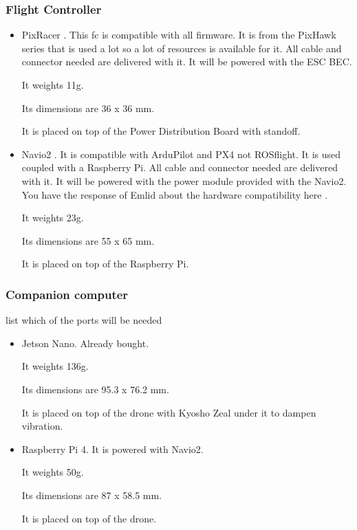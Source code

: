 \subsubsection{Flight Controller}
\begin{itemize}
    \item PixRacer \cite{mrobotics_pixracer}. This \gls{fc} is compatible with all firmware. It is from the PixHawk series that is used a lot so a lot of resources is available for it. All cable and connector needed are delivered with it. It will be powered with the ESC BEC.

          It weights 11g.

          Its dimensions are 36 x 36 mm.

          It is placed on top of the Power Distribution Board with standoff.

    \item Navio2 \cite{emlid_navio2}. It is compatible with ArduPilot and PX4 not ROSflight. It is used coupled with a Raspberry Pi. All cable and connector needed are delivered with it. It will be powered with the power module \cite{emlid_power_module} provided with the Navio2. You have the response of Emlid about the hardware compatibility here \cite{emlid_rpi_compatibility}.

          It weights 23g.

          Its dimensions are 55 x 65 mm.

          It is placed on top of the Raspberry Pi.
\end{itemize}

\subsubsection{Companion computer}
list which of the ports will be needed

\begin{itemize}
    \item Jetson Nano. Already bought.

          It weights 136g.

          Its dimensions are 95.3 x 76.2 mm.

          It is placed on top of the drone with Kyosho Zeal under it to dampen vibration.

    \item Raspberry Pi 4. It is powered with Navio2.

          It weights 50g.

          Its dimensions are 87 x 58.5 mm.

          It is placed on top of the drone.
\end{itemize}

